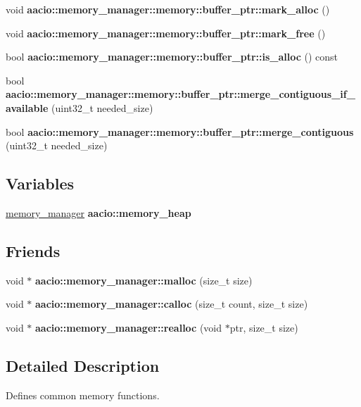 \begin{DoxyCompactItemize}
void {\bfseries aacio\+::memory\+\_\+manager\+::memory\+::buffer\+\_\+ptr\+::mark\+\_\+alloc} ()
\item 
\mbox{\label{group__memorycppapi_gaf50f6531bf89aba9d1df543c4079312b}} 
void {\bfseries aacio\+::memory\+\_\+manager\+::memory\+::buffer\+\_\+ptr\+::mark\+\_\+free} ()
\item 
\mbox{\label{group__memorycppapi_ga1b90686f19097b8c3da44f6eddd89c68}} 
bool {\bfseries aacio\+::memory\+\_\+manager\+::memory\+::buffer\+\_\+ptr\+::is\+\_\+alloc} () const
\item 
\mbox{\label{group__memorycppapi_gaae486acd43375a45bcb49287bbd74487}} 
bool {\bfseries aacio\+::memory\+\_\+manager\+::memory\+::buffer\+\_\+ptr\+::merge\+\_\+contiguous\+\_\+if\+\_\+available} (uint32\+\_\+t needed\+\_\+size)
\item 
\mbox{\label{group__memorycppapi_ga8158001e8c0700ddfcd32ec19cf440b6}} 
bool {\bfseries aacio\+::memory\+\_\+manager\+::memory\+::buffer\+\_\+ptr\+::merge\+\_\+contiguous} (uint32\+\_\+t needed\+\_\+size)
\end{DoxyCompactItemize}
\subsection*{Variables}
\begin{DoxyCompactItemize}
\item 
\mbox{\label{group__memorycppapi_ga7cb8734302ee043d13af2827fd77d733}} 
\mbox{\hyperlink{classaacio_1_1memory__manager}{memory\+\_\+manager}} {\bfseries aacio\+::memory\+\_\+heap}
\end{DoxyCompactItemize}
\subsection*{Friends}
\begin{DoxyCompactItemize}
\item 
\mbox{\label{group__memorycppapi_ga7ac38fce3243a7dcf448301ee9ffd392}} 
void $\ast$ {\bfseries aacio\+::memory\+\_\+manager\+::malloc} (size\+\_\+t size)
\item 
\mbox{\label{group__memorycppapi_gadd8a2c74f2c5f5e3db163234988f61d6}} 
void $\ast$ {\bfseries aacio\+::memory\+\_\+manager\+::calloc} (size\+\_\+t count, size\+\_\+t size)
\item 
\mbox{\label{group__memorycppapi_ga1a6b5e8d2f1c37e5b43e4345586075be}} 
void $\ast$ {\bfseries aacio\+::memory\+\_\+manager\+::realloc} (void $\ast$ptr, size\+\_\+t size)
\end{DoxyCompactItemize}


\subsection{Detailed Description}
Defines common memory functions. 

